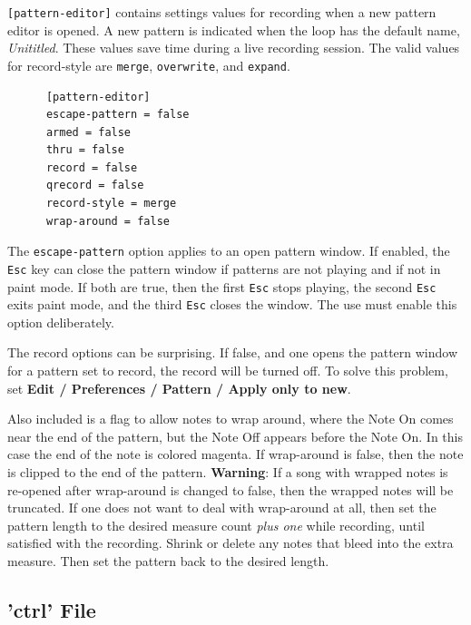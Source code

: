    \texttt{[pattern-editor]} contains settings values for recording
    when a new pattern editor is opened. A new pattern is indicated when
   the loop has the default name, \textsl{Unititled}.
    These values save time during a live recording session.
   The valid values for record-style are \texttt{merge},
    \texttt{overwrite}, and \texttt{expand}.

   \begin{verbatim}
      [pattern-editor]
      escape-pattern = false
      armed = false
      thru = false
      record = false
      qrecord = false
      record-style = merge
      wrap-around = false
   \end{verbatim}

   The \texttt{escape-pattern} option applies to an open pattern window.
   If enabled, the \texttt{Esc} key can close the pattern window if
   patterns are not playing and if not in paint mode.  If both are true, then
   the first \texttt{Esc} stops playing, the second \texttt{Esc} exits
   paint mode, and the third \texttt{Esc} closes the window.
   The use must enable this option deliberately.

   The record options can be surprising. If false, and
   one opens the pattern window for a pattern set to record, the
   record will be turned off.
   To solve this problem, set
   \textbf{Edit / Preferences / Pattern / Apply only to new}.

   Also included is a flag to allow notes to wrap around, where the Note On
   comes near the end of the pattern, but the Note Off appears before the
   Note On.
   In this case the end of the note is colored magenta.
   If wrap-around is false, then the note is clipped to the end of the pattern.
   \textbf{Warning}:
   If a song with wrapped notes is re-opened after wrap-around is changed
   to false, then the wrapped notes will be truncated.
   If one does not want to deal with wrap-around at all, then set the pattern
   length to the desired measure count \textsl{plus one} while recording, until
   satisfied with the recording.  Shrink or delete any notes that bleed into
   the extra measure. Then set the pattern back to the desired length.

\subsection{'ctrl' File}
\label{subsec:configuration_ctrl}

